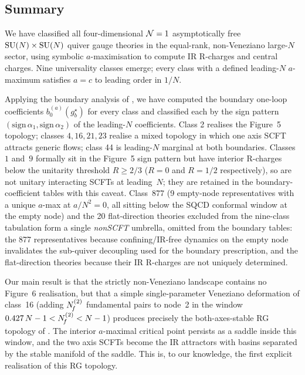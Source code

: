 
\subsection{Summary}

We have classified all four-dimensional $\mathcal{N}=1$ asymptotically free
$\mathrm{SU}(N)\times\mathrm{SU}(N)$ quiver gauge theories in the equal-rank,
non-Veneziano large-$N$ sector, using symbolic $a$-maximisation to
compute IR R-charges and central charges.  Nine universality classes
emerge; every class with a defined leading-$N$ $a$-maximum satisfies
$a=c$ to leading order in $1/N$.

Applying the boundary analysis of \cite{IW2005}, we have computed the
boundary one-loop coefficients $b_{0}^{(a)}(g_{b}^{\star})$ for every
class and classified each by the sign pattern
$(\text{sign}\,\alpha_{1},\text{sign}\,\alpha_{2})$ of the
leading-$N$ coefficients.  Class 2 realises the Figure~5 topology;
classes $4,16,21,23$ realise a mixed topology in which one axis SCFT
attracts generic flows; class 44 is leading-$N$ marginal at both
boundaries.  Classes~$1$ and~$9$ formally sit in the Figure~5 sign
pattern but have interior R-charges below the unitarity threshold
$R\ge 2/3$ ($R=0$ and $R=1/2$ respectively), so are not unitary
interacting SCFTs at leading~$N$; they are retained in the
boundary-coefficient tables with this caveat.  Class~$877$ (9
empty-node representatives with a unique $a$-max at $a/N^{2}=0$, all
sitting below the SQCD conformal window at the empty node) and the
20 flat-direction theories excluded from the nine-class tabulation
form a single \emph{nonSCFT} umbrella, omitted from the boundary
tables: the 877 representatives because confining/IR-free dynamics on
the empty node invalidates the sub-quiver decoupling used for the
boundary prescription, and the flat-direction theories because their
IR R-charges are not uniquely determined.

Our main result is that the strictly non-Veneziano landscape contains
no Figure~6 realisation, but that a simple single-parameter Veneziano
deformation of class~16 (adding $N_{\!f}^{(2)}$ fundamental pairs to
node~2 in the window $0.427\,N-1<N_{\!f}^{(2)}<N-1$) produces precisely
the both-axes-stable RG topology of \cite[Fig.~6]{IW2005}.  The
interior $a$-maximal critical point persists as a saddle inside this
window, and the two axis SCFTs become the IR attractors with basins
separated by the stable manifold of the saddle.  This is, to our
knowledge, the first explicit realisation of this RG topology.

